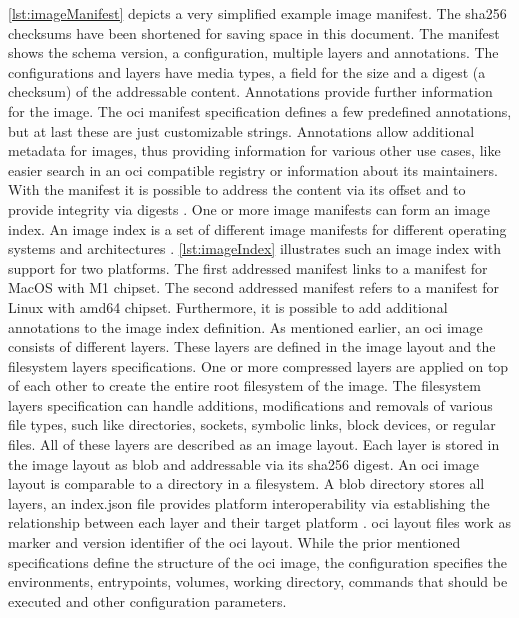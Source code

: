 \documentclass[titlepage]{report}
\begin{document}
\autoref{lst:imageManifest} depicts a very simplified example image manifest. The \gls{sha256} checksums have been shortened for saving space in this document.
The manifest shows the schema version, a configuration, multiple layers and annotations. The configurations and layers have media types, a field for the
size and a digest (a checksum) of the addressable content. Annotations provide further information for the image. The \gls{oci} manifest specification
defines a few predefined annotations, but at last these are just customizable strings. Annotations allow additional metadata for images, thus
providing information for various other use cases, like easier search in an \gls{oci} compatible registry or information about its maintainers.
With the manifest it is possible to address the content via its offset and to provide integrity via digests \cite{ImageManifestSpec}. One or more image manifests can form
an image index. An image index is a set of different image manifests for different operating systems and architectures \cite{ImageIndexSpec}. \autoref{lst:imageIndex} illustrates
such an image index with support for two platforms. The first addressed manifest links to a manifest for MacOS with M1 chipset. The second addressed manifest
refers to a manifest for Linux with amd64 chipset. Furthermore, it is possible to add additional annotations to the image index definition. As mentioned earlier,
an \gls{oci} image consists of different layers. These layers are defined in the image layout and the filesystem layers specifications. One or more compressed layers are applied
on top of each other to create the entire root filesystem of the image\cite{ImageFSSpec}. The filesystem layers specification can handle 
additions, modifications and removals of various file types, such like directories, sockets, symbolic links, block devices, or regular files\cite{ImageFSSpec}.
All of these layers are described as an image layout. Each layer is stored in the image layout as \gls{blob} and addressable via its \gls{sha256} digest. An \gls{oci} image layout
is comparable to a directory in a filesystem. A \gls{blob} directory stores all layers, an index.json file provides platform interoperability via establishing the relationship
between each layer and their target platform \cite{ImageLayoutSpec}. \gls{oci} layout files work as marker and version identifier of the \gls{oci} layout. While the prior mentioned specifications
define the structure of the \gls{oci} image, the configuration specifies the environments, entrypoints, volumes, working directory, commands that should be executed and other configuration parameters.
\end{document}
